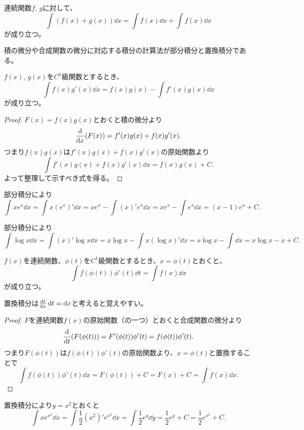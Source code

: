 \begin{proposition}
連続関数$f$, $g$に対して、
$$
\int (f(x)+g(x))\dd{x} = \int f(x)\dd{x}+\int f(x)\dd{x}
$$
が成り立つ。
\end{proposition}

積の微分や合成関数の微分に対応する積分の計算法が部分積分と置換積分である。

\begin{theorem}[部分積分]
$f(x)$, $g(x)$を$C^1$級関数とするとき、
$$
\int f(x)g'(x)\dd{x} = f(x)g(x)-\int f'(x)g(x)\dd{x}
$$
が成り立つ。
\end{theorem}

\begin{proof}
$F(x) = f(x)g(x)$とおくと積の微分より
$$
\dv{x}(F(x)) = f'(x)g(x)+f(x)g'(x).
$$
つまり$f(x)g(x)$は$f'(x)g(x)+f(x)g'(x)$の原始関数より
$$
\int f'(x)g(x)+f(x)g'(x)\dd{x} = f(x)g(x)+C.
$$
よって整理して示すべき式を得る。
\end{proof}

\begin{example}
部分積分により
$$
\int x e^x\dd{x} = \int x (e^x)'\dd{x} = x e^x-\int (x)' e^x\dd{x} = x e^x-\int e^x\dd{x} = (x-1)e^x+C.
$$
\end{example}

\begin{example}
部分積分により
$$
\int \log x\dd{x} = \int (x)'\log x\dd{x} = x\log x-\int x(\log x)'\dd{x} = x\log x-\int \dd{x} = x\log x-x+C.
$$
\end{example}

\begin{theorem}[置換積分]
$f(x)$を連続関数、$\phi(t)$を$C^1$級関数とするとき、$x = \phi(t)$とおくと、
$$
\int f(\phi(t))\phi'(t)\dd{t} = \int f(x)\dd{x}
$$
が成り立つ。
\end{theorem}

\begin{remark}
置換積分は$\dv{t}{x}\dd{t} = \dd{x}$と考えると覚えやすい。
\end{remark}

\begin{proof}
$F$を連続関数$f(x)$の原始関数（の一つ）とおくと合成関数の微分より
$$
\dv{t}(F(\phi(t))) = F'(\phi(t))\phi'(t) = f(\phi(t))\phi'(t).
$$
つまり$F(\phi(t))$は$f(\phi(t))\phi'(t)$の原始関数より、$x = \phi(t)$と置換することで
$$
\int f(\phi(t))\phi'(t)\dd{x} = F(\phi(t))+C = F(x)+C = \int f(x)\dd{x}.
$$
\end{proof}

\begin{example}
置換積分により$y = x^2$とおくと
$$
\int x e^{x^2}\dd{x} = \int \frac{1}{2}(x^2)' e^{x^2}\dd{x} = \int \frac{1}{2}e^y\dd{y} = \frac{1}{2}e^y+C = \frac{1}{2}e^{x^2}+C.
$$
\end{example}

